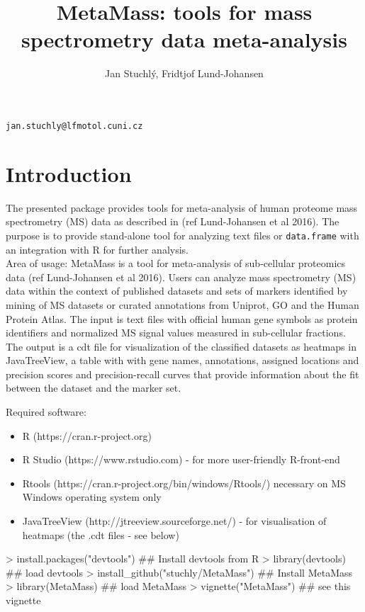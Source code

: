 \documentclass[a4paper]{article}
\title{MetaMass: tools for mass spectrometry data meta-analysis}
\author{Jan Stuchlý, Fridtjof Lund-Johansen}
\numberwithin{equation}{subsection}
\begin{document}
\maketitle
\begin{center}
{\tt jan.stuchly@lfmotol.cuni.cz}
\end{center}
\section{Introduction}
The presented package provides tools for meta-analysis of human proteome mass spectrometry (MS) data as described in (ref Lund-Johansen et al 2016). The purpose is to provide stand-alone tool for
analyzing text files or \texttt{data.frame} with an integration
with R for further analysis.
\\
Area of usage: MetaMass is a tool for meta-analysis of sub-cellular proteomics data (ref Lund-Johansen et al 2016). Users can analyze  mass spectrometry (MS) data  within the context of published datasets and sets of markers identified by mining of MS datasets or curated annotations from Uniprot, GO and the Human Protein Atlas. The input is text files with official human gene symbols as protein identifiers and normalized MS signal values measured in sub-cellular fractions. The output is a cdt file for visualization of the classified datasets as heatmaps in JavaTreeView, a table with with gene names, annotations, assigned locations and precision scores and precision-recall curves that provide information about the fit between the dataset and the marker set.

\noindent Required software:
\begin{itemize}
\item[] R (https://cran.r-project.org)
\item[] R Studio (https://www.rstudio.com) - for more user-friendly R-front-end
\item[] Rtools (https://cran.r-project.org/bin/windows/Rtools/)
  necessary on MS Windows operating system only
\item[] JavaTreeView (http://jtreeview.sourceforge.net/) - for visualisation
of heatmaps (the .cdt files - see below)
\end{itemize}
\scriptsize
\begin{Schunk}
\begin{Sinput}
> install.packages("devtools") ##  Install devtools from R
> library(devtools) ## load devtools
> install_github("stuchly/MetaMass") ## Install MetaMass
> library(MetaMass) ## load MetaMass
> vignette("MetaMass") ## see this vignette
\end{Sinput}
\end{Schunk}
\normalsize
\end{document}
